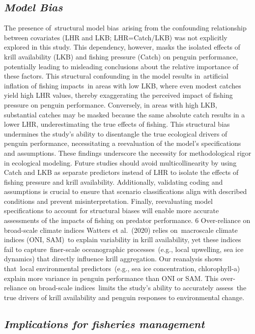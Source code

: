 \documentclass[]{elsarticle} %
\begin{document}
\subsection{\texorpdfstring{\emph{Model
Bias}}{Model Bias}}\label{model-bias-1}

The presence of~structural model bias~arising from the confounding
relationship between covariates (LHR and LKB; LHR=Catch/LKB) was not
explicitly explored in this study. This dependency, however, masks the
isolated effects of krill availability (LKB) and fishing pressure
(Catch) on penguin performance, potentially leading to misleading
conclusions about the relative importance of these factors. This
structural confounding in the model results in~artificial inflation of
fishing impacts~in areas with low LKB, where even modest catches yield
high LHR values, thereby exaggerating the perceived impact of fishing
pressure on penguin performance. Conversely, in areas with high LKB,
substantial catches may be masked because the same absolute catch
results in a lower LHR, underestimating the true effects of fishing.
This structural bias undermines the study's ability to disentangle the
true ecological drivers of penguin performance, necessitating a
reevaluation of the model's specifications and assumptions. These
findings underscore the necessity for methodological rigor in ecological
modeling. Future studies should avoid multicollinearity by using Catch
and LKB as separate predictors instead of LHR to isolate the effects of
fishing pressure and krill availability. Additionally, validating coding
and assumptions is crucial to ensure that scenario classifications align
with described conditions and prevent misinterpretation. Finally,
reevaluating model specifications to account for structural biases will
enable more accurate assessments of the impacts of fishing on predator
performance. 6 Over-reliance on broad-scale climate indices Watters et
al.~(2020) relies on~macroscale climate indices (ONI, SAM)~to explain
variability in krill availability, yet these indices fail to
capture~finer-scale oceanographic processes~(e.g., local upwelling, sea
ice dynamics) that directly influence krill aggregation. Our reanalysis
shows that~local environmental predictors~(e.g., sea ice concentration,
chlorophyll-a) explain more variance in penguin performance than ONI or
SAM. This over-reliance on broad-scale indices~limits the study's
ability to accurately assess~the true drivers of krill availability and
penguin responses to environmental change.

\subsection{\texorpdfstring{\emph{Implications for fisheries
management}}{Implications for fisheries management}}\label{implications-for-fisheries-management}
\end{document}
